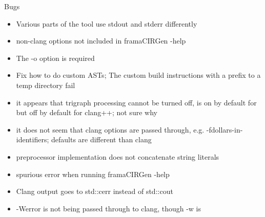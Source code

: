 \documentclass[web]{frama-c-book}
\begin{document}
Bugs
\begin{itemize}
\item Various parts of the tool use stdout and stderr differently
\item non-clang options not included in framaCIRGen -help
\item The -o option is required
\item Fix how to do custom ASTs; The custom build instructions with a prefix to a temp directory fail
\item it appears that trigraph processing cannot be turned off, is on by default for \irg but off by default for clang++; not sure why
\item it does not seem that clang options are passed through, e.g. -fdollars-in-identifiers; \irg defaults are different than clang
\item preprocessor implementation does not concatenate string literals
\item spurious error when running  framaCIRGen -help
\item Clang output goes to std::cerr instead of std::cout
\item -Werror is not being passed through to clang, though -w is
\end{itemize}


\cleardoublepage
{}






\cleardoublepage
{}
\printindex
\end{document}
